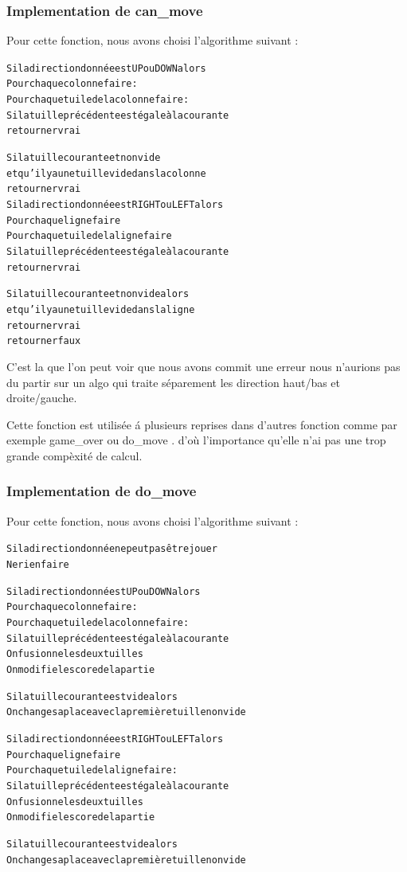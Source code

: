 \documentclass[12pt]{article}
\begin{document}
\subsubsection{Implementation de \og can\_move \fg{}}
Pour cette fonction, nous avons choisi l'algorithme suivant :

\begin{alltt}
{\color{gray}
Si la direction donn\'ee est \og UP \fg{} ou \og DOWN \fg{} alors
    Pour chaque colonne faire :
        Pour chaque tuile de la colonne faire :
            Si la tuille pr\'ec\'edente est \'egale \`a la courante
                retourner vrai
 		
            Si la tuille courante et non vide 
                   et qu'il y a une tuille vide dans la colonne
                retourner vrai	    	
Si la direction donn\'ee est \og RIGHT \fg{} ou \og LEFT \fg{} alors
    Pour chaque ligne faire 
        Pour chaque tuile de la ligne faire
            Si la tuille pr\'ec\'edente est \'egale \`a la courante
                retourner vrai
 		
            Si la tuille courante et non vide alors
                   et qu'il y a une tuille vide dans la ligne
                retourner vrai	    	
retourner faux
}
\end{alltt}

C'est la que l'on peut voir que nous avons commit une erreur nous n'aurions
pas du partir sur un algo qui traite séparement les direction haut/bas et droite/gauche.

Cette fonction est utilis\'ee \'a plusieurs reprises dans d'autres fonction
comme par exemple \og game\_over \fg{} ou \og do\_move \fg{}. d'o\`u
l'importance qu'elle n'ai pas une trop grande comp\`exit\'e de calcul.

\subsubsection{Implementation de \og do\_move \fg{}}
Pour cette fonction, nous avons choisi l'algorithme suivant :
\begin{alltt}
{\color{gray}
Si la direction donn\'ee ne peut pas \^etre jouer
    Ne rien faire
    
    
Si la direction donn\'e est \og UP \fg{} ou \og DOWN \fg{} alors
    Pour chaque colonne faire :
        Pour chaque tuile de la colonne faire :
            Si la tuille pr\'ec\'edente est \'egale \`a la courante
                On fusionne les deux tuilles
                On modifie le score de la partie
            
            Si la tuille courante est vide alors
            	On change sa place avec la premi\`ere tuille non vide
            	
Si la direction donn\'ee est \og RIGHT \fg{} ou \og LEFT \fg{} alors
    Pour chaque ligne faire 
        Pour chaque tuile de la ligne faire :
            Si la tuille pr\'ec\'edente est \'egale \`a la courante
                On fusionne les deux tuilles
                On modifie le score de la partie
            
            Si la tuille courante est vide alors
            	On change sa place avec la premi\`ere tuille non vide
}
\end{alltt}
\end{document}
